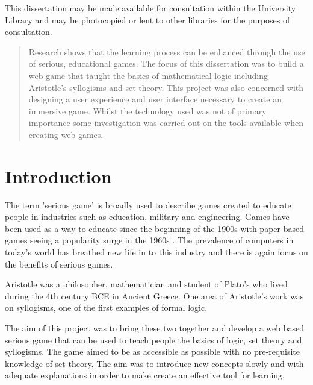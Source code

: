 \documentclass[12pt,a4paper]{report}
\begin{document}
\newpage
\clearpage
\thispagestyle{empty}
\vspace*{\fill}
\begin{center}
\begin{minipage}{.8\textwidth}
This dissertation may be made available for consultation within the University
Library and may be photocopied or lent to other libraries for the purposes of consultation.

\end{minipage}
\end{center}
\vfill %
\clearpage

\begin{abstract}
Research shows that the learning process can be enhanced through the use of serious, educational games. The focus of this dissertation was to build a web game that taught the basics of mathematical logic including Aristotle's syllogisms and set theory. This project was also concerned with designing a user experience and user interface necessary to create an immersive game. Whilst the technology used was not of primary importance some investigation was carried out on the tools available when creating web games.
\end{abstract}

\cleardoublepage
{}
\tableofcontents
\cleardoublepage
{}
\setcounter{page}{1} %
\chapter{Introduction}
The term 'serious game' is broadly used to describe games created to educate people in industries such as education, military and engineering. Games have been used as a way to educate since the beginning of the 1900s with paper-based games seeing a popularity surge in the 1960s \citep{rice2007assessing}. The prevalence of computers in today's world has breathed new life in to this industry and there is again focus on the benefits of serious games.

Aristotle was a philosopher, mathematician and student of Plato's who lived during the 4th century BCE in Ancient Greece. One area of Aristotle's work was on syllogisms, one of the first examples of formal logic.

The aim of this project was to bring these two together and develop a web based serious game that can be used to teach people the basics of logic, set theory and syllogisms. The game aimed to be as accessible as possible with no pre-requisite knowledge of set theory. The aim was to introduce new concepts slowly and with adequate explanations in order to make create an effective tool for learning.
\end{document}
